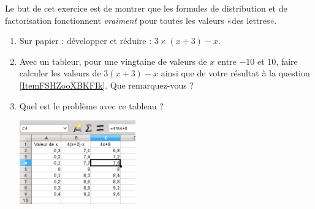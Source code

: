 
\begin{exercice}\label{exo2smath-0255}

    Le but de cet exercice est de montrer que les formules de distribution et de factorisation fonctionnent \emph{vraiment} pour toutes les valeurs «des lettres».

    \begin{enumerate}
        \item   \label{ItemFSHZooXBKFIk}
            Sur papier : développer et réduire : \( 3\times (x+3)-x\).
        \item
            Avec un tableur, pour une vingtaine de valeurs de \( x\) entre \( -10\) et \( 10\), faire calculer les valeurs de \( 3(x+3)-x\) ainsi que de votre résultat à la question \ref{ItemFSHZooXBKFIk}. Que remarquez-vous ?
        \item
            Quel est le problème avec ce tableau ?

            \begin{center}
            \includegraphics[width=5cm]{faux_tableur.pdf} 
            \end{center}

    \end{enumerate}
    
\end{exercice}
